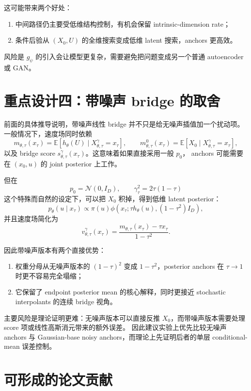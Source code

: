 \documentclass[UTF8,11pt]{ctexart}
\newcommand{\E}{\mathbb{E}}
\newcommand{\cN}{\mathcal{N}}
\begin{document}
这可能带来两个好处：
\begin{enumerate}
\item 中间路径仍主要受低维结构控制，有机会保留 intrinsic-dimension rate；
\item 条件后验从 \((X_0,U)\) 的全维搜索变成低维 latent 搜索，anchors 更高效。
\end{enumerate}

风险是 \(g_\psi\) 的引入会让模型更复杂，需要避免把问题变成另一个普通 autoencoder 或 GAN。

\section{重点设计四：带噪声 bridge 的取舍}

前面的具体推导说明，带噪声线性 bridge 并不只是给无噪声插值加一个扰动项。
一般情况下，速度场同时依赖
\[
m_{\theta,\tau}(x_\tau)=\E[h_\theta(U)\mid X_{\theta,\tau}^{\gamma}=x_\tau],
\qquad
m_{\theta,\tau}^{0}(x_\tau)=\E[X_0\mid X_{\theta,\tau}^{\gamma}=x_\tau],
\]
以及 bridge score \(s_{\theta,\tau}^{\gamma}(x_\tau)\)。这意味着如果直接采用一般 \(p_0\)，
anchors 可能需要在 \((x_0,u)\) 的 joint posterior 上工作。

但在
\[
p_0=\cN(0,I_D),
\qquad
\gamma_\tau^2=2\tau(1-\tau)
\]
这个特殊而自然的设定下，可以把 \(X_0\) 积掉，得到低维 latent posterior：
\[
p_\theta(u\mid x_\tau)
\propto
\pi(u)
\phi\left(x_\tau;\tau h_\theta(u),(1-\tau^2)I_D\right),
\]
并且速度场简化为
\[
v_{\theta,\tau}^{\gamma}(x_\tau)
=
\frac{m_{\theta,\tau}(x_\tau)-\tau x_\tau}{1-\tau^2}.
\]

因此带噪声版本有两个直接优势：
\begin{enumerate}
\item 权重分母从无噪声版本的 \((1-\tau)^2\) 变成 \(1-\tau^2\)，posterior anchors 在 \(\tau\to1\) 时更不容易完全塌缩；
\item 它保留了 endpoint posterior mean 的核心解释，同时更接近 stochastic interpolants 的连续 bridge 视角。
\end{enumerate}

主要风险是理论证明更难：无噪声版本可以直接反推 \(X_0\)，而带噪声版本需要处理 score 项或线性高斯消元带来的额外误差。
因此建议实验上优先比较无噪声 anchors 与 Gaussian-base noisy anchors，而理论上先证明后者的单层 conditional-mean 误差控制。

\section{可形成的论文贡献}
\end{document}

